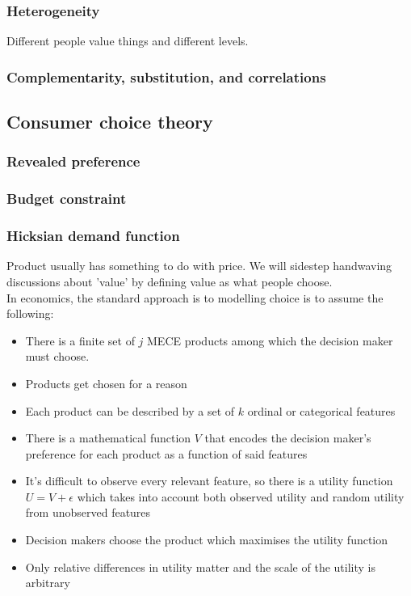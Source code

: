 \documentclass{article}
\begin{document}
\subsubsection{Heterogeneity}
Different people value things and different levels.

\subsubsection{Complementarity, substitution, and correlations}

\subsection{Consumer choice theory} 

\subsubsection{Revealed preference}

\subsubsection{Budget constraint}

\subsubsection{Hicksian demand function}





Product usually has something to do with price. We will sidestep handwaving discussions about 'value' by  defining value as what people choose. \\

In economics, the standard approach is to modelling choice is to assume the following:
\begin{itemize}
  \item There is a finite set of $j$ MECE products among which the decision maker must choose.
  \item Products get chosen for a reason
  \item Each product can be described by a set of $k$ ordinal or categorical features
  \item There is a mathematical function $V$ that encodes the decision maker's preference for each product as a function of said features
  \item It's difficult to observe every relevant feature, so there is a utility function $U = V + \epsilon$ which takes into account both observed utility and random utility from unobserved features
  \item  Decision makers choose the product which maximises the utility function 
  \item  Only relative differences in utility matter and the scale of the utility is arbitrary
\end{itemize}
\end{document}
